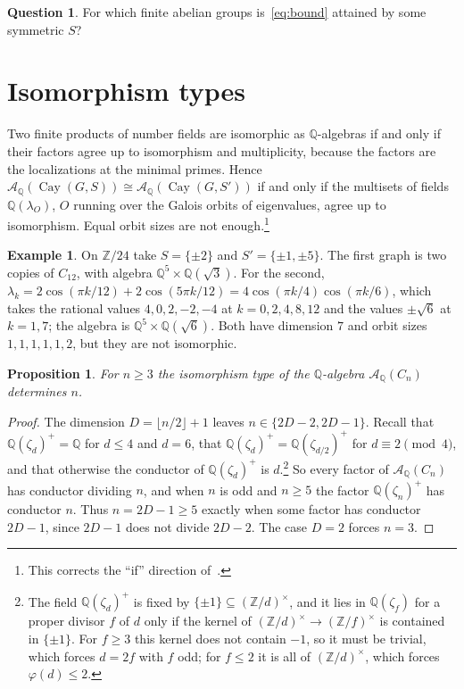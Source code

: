 \documentclass[11pt]{amsart}
\newtheorem{proposition}[theorem]{Proposition}
\theoremstyle{definition}
\newtheorem{example}[theorem]{Example}
\newtheorem{question}[theorem]{Question}
\theoremstyle{remark}
\numberwithin{equation}{section}
\newcommand{\Q}{\mathbb{Q}}
\newcommand{\Z}{\mathbb{Z}}
\newcommand{\cA}{\mathcal{A}}
\newcommand{\Cay}{\operatorname{Cay}}
\begin{document}
\begin{question}
For which finite abelian groups is~\eqref{eq:bound} attained by some symmetric $S$?
\end{question}

\section{Isomorphism types}\label{sec:type}

Two finite products of number fields are isomorphic as $\Q$-algebras if and only if their factors agree up to isomorphism and multiplicity, because the factors are the localizations at the minimal primes. Hence $\cA_\Q(\Cay(G,S))\cong\cA_\Q(\Cay(G,S'))$ if and only if the multisets of fields $\Q(\lambda_O)$, $O$ running over the Galois orbits of eigenvalues, agree up to isomorphism. Equal orbit sizes are not enough.\footnote{This corrects the ``if'' direction of~\cite[Proposition~21.1]{BMB}.}

\begin{example}\label{ex:z24}
On $\Z/24$ take $S=\{\pm2\}$ and $S'=\{\pm1,\pm5\}$. The first graph is two copies of $C_{12}$, with algebra $\Q^5\times\Q(\sqrt3)$. For the second, $\lambda_k=2\cos(\pi k/12)+2\cos(5\pi k/12)=4\cos(\pi k/4)\cos(\pi k/6)$, which takes the rational values $4,0,2,-2,-4$ at $k=0,2,4,8,12$ and the values $\pm\sqrt6$ at $k=1,7$; the algebra is $\Q^5\times\Q(\sqrt6)$. Both have dimension $7$ and orbit sizes $1,1,1,1,1,2$, but they are not isomorphic.
\end{example}

\begin{proposition}\label{prop:type}
For $n\ge3$ the isomorphism type of the $\Q$-algebra $\cA_\Q(C_n)$ determines $n$.
\end{proposition}

\begin{proof}
The dimension $D=\lfloor n/2\rfloor+1$ leaves $n\in\{2D-2,2D-1\}$. Recall that $\Q(\zeta_d)^+=\Q$ for $d\le4$ and $d=6$, that $\Q(\zeta_d)^+=\Q(\zeta_{d/2})^+$ for $d\equiv2\pmod 4$, and that otherwise the conductor of $\Q(\zeta_d)^+$ is $d$.\footnote{The field $\Q(\zeta_d)^+$ is fixed by $\{\pm1\}\subseteq(\Z/d)^\times$, and it lies in $\Q(\zeta_f)$ for a proper divisor $f$ of $d$ only if the kernel of $(\Z/d)^\times\to(\Z/f)^\times$ is contained in $\{\pm1\}$. For $f\ge3$ this kernel does not contain $-1$, so it must be trivial, which forces $d=2f$ with $f$ odd; for $f\le2$ it is all of $(\Z/d)^\times$, which forces $\varphi(d)\le2$.} So every factor of $\cA_\Q(C_n)$ has conductor dividing $n$, and when $n$ is odd and $n\ge5$ the factor $\Q(\zeta_n)^+$ has conductor $n$. Thus $n=2D-1\ge5$ exactly when some factor has conductor $2D-1$, since $2D-1$ does not divide $2D-2$. The case $D=2$ forces $n=3$.
\end{proof}
\end{document}
